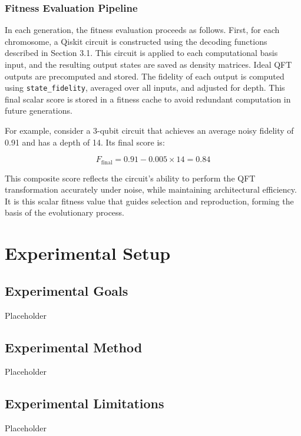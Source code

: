 \documentclass[11pt,a4paper]{article}
\begin{document}
\subsubsection*{Fitness Evaluation Pipeline}

In each generation, the fitness evaluation proceeds as follows. First, for each chromosome, a Qiskit circuit is constructed using the decoding functions described in Section 3.1. This circuit is applied to each computational basis input, and the resulting output states are saved as density matrices. Ideal QFT outputs are precomputed and stored. The fidelity of each output is computed using \texttt{state\_fidelity}, averaged over all inputs, and adjusted for depth. This final scalar score is stored in a fitness cache to avoid redundant computation in future generations.\newline

For example, consider a 3-qubit circuit that achieves an average noisy fidelity of 0.91 and has a depth of 14. Its final score is:

\[
F_{\text{final}} = 0.91 - 0.005 \times 14 = 0.84
\]

This composite score reflects the circuit’s ability to perform the QFT transformation accurately under noise, while maintaining architectural efficiency. It is this scalar fitness value that guides selection and reproduction, forming the basis of the evolutionary process.


%
%
\section{Experimental Setup}
\subsection{Experimental Goals}
Placeholder

\subsection{Experimental Method}
Placeholder

\subsection{Experimental Limitations}
Placeholder

%
%
\end{document}

